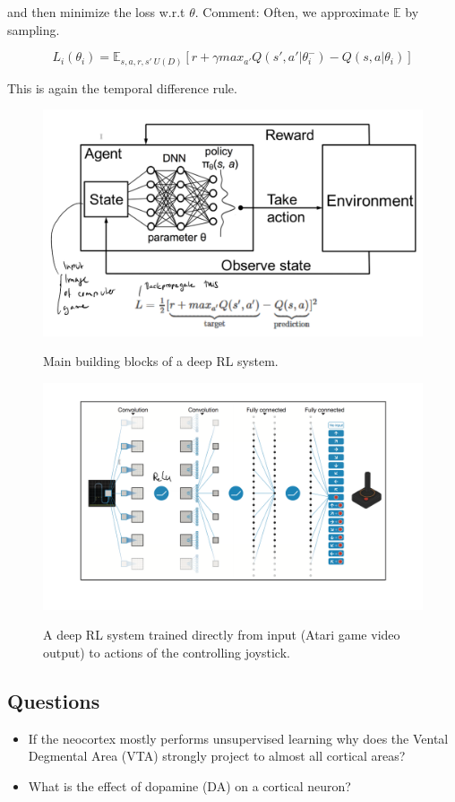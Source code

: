 \documentclass[main]{subfiles}
\begin{document}
and then minimize the loss w.r.t $\theta$. Comment: Often, we approximate $\mathbb{E}$ by sampling.

\begin{equation}
    L_i(\theta_i) = \mathbb{E}_{s,a,r,s'~U(D)} [r+ \gamma max_{a'}Q(s',a'|\theta_i^-) - Q(s,a|\theta_i)]
\end{equation}

This is again the temporal difference rule.

\begin{figure}[H]
	\centering
	\includegraphics[width=0.9\linewidth]{08_ReinforcementLearning/figures/deep-rl-1.png}
	\label{fig:rl-basic-comps}
	\caption{Main building blocks of a deep RL system.}
\end{figure}

\begin{figure}[H]
	\centering
	\includegraphics[width=0.9\linewidth]{08_ReinforcementLearning/figures/deep-rl-example.png}
	\label{fig:deep-rl-example}
	\caption{A deep RL system trained directly from input (Atari game video output) to actions of the controlling joystick.}
\end{figure}


\subsection{Questions}
\begin{itemize}
    \item If the neocortex mostly performs unsupervised learning why does the Vental Degmental Area (VTA) strongly project to almost all cortical areas?
    \item What is the effect of dopamine (DA) on a cortical neuron?
\end{itemize}
\end{document}
